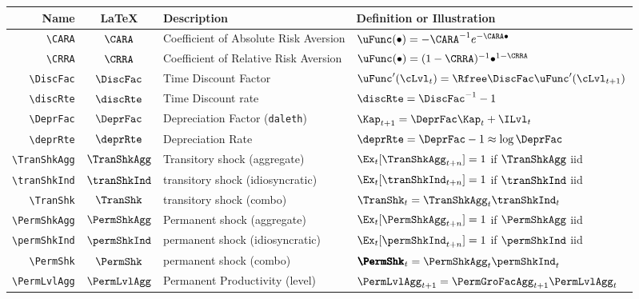 \documentclass[12pt]{\econtex}
\begin{document}
\hypertarget{Parameters}{}
\begin{table}[ht]
  \centering
  \begin{tabular}{|>{\ttfamily}rcll|} 		
    \hline
    Name    & \LaTeX         & Description & Definition or Illustration
    \\ \hline
    \verb|\CARA|        & $\CARA$       & Coefficient of Absolute Risk Aversion &$\uFunc(\bullet)=-\CARA^{-1} e^{-\CARA \bullet}$
    \\ \verb|\CRRA|        & $\CRRA$       & Coefficient of Relative Risk Aversion & $\uFunc(\bullet)=(1-\CRRA)^{-1}\bullet^{1-\CRRA}$ 
    \\ \verb|\DiscFac|     & $\DiscFac$    & Time Discount Factor & $\uFunc^{\prime}(\cLvl_{t}) =  \Rfree \DiscFac \uFunc^{\prime}(\cLvl_{t+1})$
    \\ \verb|\discRte|     & $\discRte$    & Time Discount rate & $\discRte=\DiscFac^{-1}-1$
    \\ \verb|\DeprFac|     & $\DeprFac$    & Depreciation Factor (\texttt{daleth}) & $\Kap_{t+1} = \DeprFac \Kap_{t}+\ILvl_{t}$
    \\ \verb|\deprRte|     & $\deprRte$    & Depreciation Rate & $\deprRte = \DeprFac -1 \approx \log \DeprFac $
    \\ \verb|\TranShkAgg|  & $\TranShkAgg$ & Transitory shock (aggregate) & $\Ex_{t}[\TranShkAgg_{t+n}]=1$ if $\TranShkAgg$ iid
    \\ \verb|\tranShkInd|  & $\tranShkInd$ & transitory shock (idiosyncratic) &  $\Ex_{t}[\tranShkInd_{t+n}]=1$ if $\tranShkInd$ iid
    \\ \verb|\TranShk|      & $\TranShk$   & transitory shock (combo) &  $\TranShk_{t} = \TranShkAgg_{t}\tranShkInd_{t}$
    \\ \verb|\PermShkAgg|  & $\PermShkAgg$ & Permanent shock (aggregate) & $\Ex_{t}[\PermShkAgg_{t+n}]=1$ if $\PermShkAgg$ iid
    \\ \verb|\permShkInd|  & $\permShkInd$ & permanent shock (idiosyncratic) & $\Ex_{t}[\permShkInd_{t+n}]=1$ if $\permShkInd$ iid
    \\ \verb|\PermShk|      & $\PermShk$ & permanent shock (combo) & $\pmb{\PermShk}_{t} = \PermShkAgg_{t} \permShkInd_{t}$
    \\ \verb|\PermLvlAgg|  & $\PermLvlAgg$ & Permanent Productivity (level) & $\PermLvlAgg_{t+1} = \PermGroFacAgg_{t+1}\PermLvlAgg_{t} $

\end{tabular}
\end{table}
\end{document}
